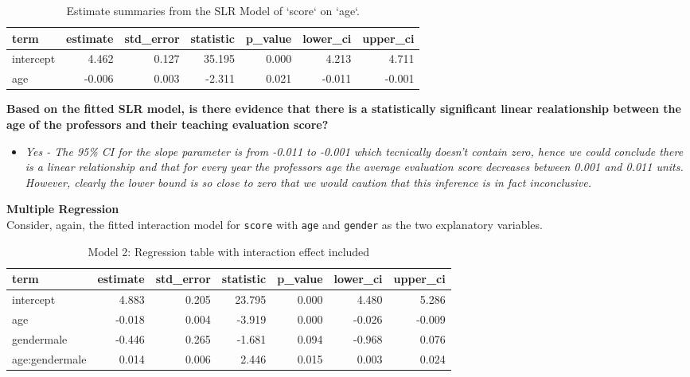 \documentclass[]{article}
\providecommand{\tightlist}{%
  \setlength{\itemsep}{0pt}\setlength{\parskip}{0pt}}
\begin{document}
\begin{table}[!h]

\caption{\label{tab:table4}Estimate summaries from the SLR Model of `score` on `age`.}
\centering
\begin{tabular}[t]{lrrrrrr}
\toprule
term & estimate & std\_error & statistic & p\_value & lower\_ci & upper\_ci\\
\midrule
intercept & 4.462 & 0.127 & 35.195 & 0.000 & 4.213 & 4.711\\
age & -0.006 & 0.003 & -2.311 & 0.021 & -0.011 & -0.001\\
\bottomrule
\end{tabular}
\end{table}

\textbf{Based on the fitted SLR model, is there evidence that there is a
statistically significant linear realationship between the age of the
professors and their teaching evaluation score?}

\begin{itemize}
\tightlist
\item
  \emph{Yes - The 95\% CI for the slope parameter is from -0.011 to
  -0.001 which tecnically doesn't contain zero, hence we could conclude
  there is a linear relationship and that for every year the professors
  age the average evaluation score decreases between 0.001 and 0.011
  units. However, clearly the lower bound is so close to zero that we
  would caution that this inference is in fact inconclusive.}
\end{itemize}

\textbf{Multiple Regression}\\
Consider, again, the fitted interaction model for \texttt{score} with
\texttt{age} and \texttt{gender} as the two explanatory variables.

\begin{table}[!h]

\caption{\label{tab:table5}Model 2: Regression table with interaction effect included}
\centering
\begin{tabular}[t]{lrrrrrr}
\toprule
term & estimate & std\_error & statistic & p\_value & lower\_ci & upper\_ci\\
\midrule
intercept & 4.883 & 0.205 & 23.795 & 0.000 & 4.480 & 5.286\\
age & -0.018 & 0.004 & -3.919 & 0.000 & -0.026 & -0.009\\
gendermale & -0.446 & 0.265 & -1.681 & 0.094 & -0.968 & 0.076\\
age:gendermale & 0.014 & 0.006 & 2.446 & 0.015 & 0.003 & 0.024\\
\bottomrule
\end{tabular}
\end{table}
\end{document}

